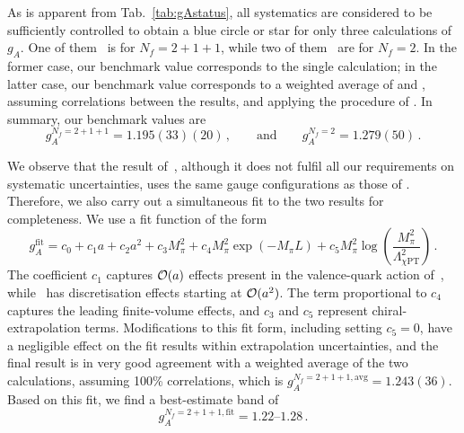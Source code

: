 
As is apparent from Tab.~\ref{tab:gAstatus}, all systematics are considered to be 
sufficiently controlled to obtain a blue circle or star for only three calculations of $g_A$.
%
One of them~\cite{Bhattacharya:2016zcn} is for $N_f=2+1+1$, while two of 
them~\cite{Capitani:2017qpc,Bali:2014nma} are for $N_f=2$.
%
In the former case, our benchmark value corresponds to the single calculation;
in the latter case, our benchmark value corresponds to a weighted average 
of \cite{Capitani:2017qpc} and \cite{Bali:2014nma}, assuming correlations
between the results, and applying the procedure of \cite{Schmelling:1994pz}.
%
In summary, our benchmark values are
\begin{equation}\label{eq:gAcriteria}
g_A^{N_f=2+1+1} = 1.195(33)(20)
\,,\qquad \mathrm{and}\qquad 
g_A^{N_f=2} = 1.279(50)\,.
\end{equation}

We observe that the result of~\cite{Berkowitz:2017gql}, although it does
not fulfil all our requirements on systematic uncertainties, uses the same 
gauge configurations as those of \cite{Bhattacharya:2016zcn}.
%
Therefore, we also carry out a simultaneous fit to the two results for
completeness.
%
We use a fit function of the form
\begin{equation}
g_A^{\mathrm{fit}} 
= 
c_0 + 
c_1a + 
c_2a^2 + 
c_3M_\pi^2 + 
c_4M_\pi^2 \exp(-M_\pi L) +
c_5M_\pi^2 \log\left(\frac{M_\pi^2}{\Lambda_{\chi \mathrm{PT}}^2}\right)\,.
\end{equation}
%
The coefficient $c_1$ captures ${\cal O}(a)$ effects present in the
valence-quark action of~\cite{Bhattacharya:2016zcn}, while~\cite{Berkowitz:2017gql} 
has discretisation effects starting at ${\cal O}(a^2)$. 
%
The term proportional to $c_4$ captures the leading finite-volume effects, and 
$c_3$ and $c_5$ represent chiral-extrapolation terms. 
%
Modifications to this fit form, including setting $c_5=0$, have a negligible 
effect on the fit results within extrapolation uncertainties, and the final 
result is in very good agreement with a weighted average of the two 
calculations, assuming 100\% correlations, which is 
$g_A^{N_f=2+1+1,\mathrm{avg}} = 1.243(36)$. 
%
Based on this fit, we find a best-estimate band of
\begin{equation}\label{eq:gAfit}
g_A^{N_f=2+1+1,\mathrm{fit}} = \numrange{1.22}{1.28}\,.
\end{equation}

